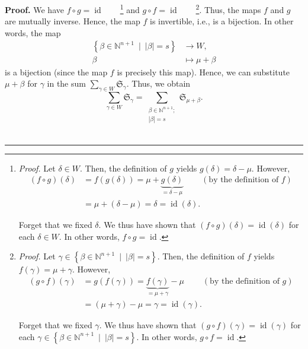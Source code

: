 \documentclass[numbers=enddot,12pt,final,onecolumn,notitlepage,english]{scrartcl}%
\theoremstyle{definition}
\newenvironment{proof}[1][Proof]{\noindent\textbf{#1.} }{\ \rule{0.5em}{0.5em}}
\let\sumnonlimits\sum
\renewcommand{\sum}{\sumnonlimits\limits}
\newenvironment{verlong}{}{}
\begin{document}
\begin{proof}
\begin{verlong}
We have $f\circ g=\operatorname*{id}$\ \ \ \ \footnote{\textit{Proof.} Let
$\delta\in W$. Then, the definition of $g$ yields $g\left(  \delta\right)
=\delta-\mu$. However,%
\begin{align*}
\left(  f\circ g\right)  \left(  \delta\right)   &  =f\left(  g\left(
\delta\right)  \right)  =\mu+\underbrace{g\left(  \delta\right)  }%
_{=\delta-\mu}\ \ \ \ \ \ \ \ \ \ \left(  \text{by the definition of }f\right)
\\
&  =\mu+\left(  \delta-\mu\right)  =\delta=\operatorname*{id}\left(
\delta\right)  .
\end{align*}
\par
Forget that we fixed $\delta$. We thus have shown that $\left(  f\circ
g\right)  \left(  \delta\right)  =\operatorname*{id}\left(  \delta\right)  $
for each $\delta\in W$. In other words, $f\circ g=\operatorname*{id}$.} and
$g\circ f=\operatorname*{id}$\ \ \ \ \footnote{\textit{Proof.} Let $\gamma
\in\left\{  \beta\in\mathbb{N}^{n+1}\ \mid\ \left\vert \beta\right\vert
=s\right\}  $. Then, the definition of $f$ yields $f\left(  \gamma\right)
=\mu+\gamma$. However,%
\begin{align*}
\left(  g\circ f\right)  \left(  \gamma\right)   &  =g\left(  f\left(
\gamma\right)  \right)  =\underbrace{f\left(  \gamma\right)  }_{=\mu+\gamma
}-\mu\ \ \ \ \ \ \ \ \ \ \left(  \text{by the definition of }g\right) \\
&  =\left(  \mu+\gamma\right)  -\mu=\gamma=\operatorname*{id}\left(
\gamma\right)  .
\end{align*}
\par
Forget that we fixed $\gamma$. We thus have shown that $\left(  g\circ
f\right)  \left(  \gamma\right)  =\operatorname*{id}\left(  \gamma\right)  $
for each $\gamma\in\left\{  \beta\in\mathbb{N}^{n+1}\ \mid\ \left\vert
\beta\right\vert =s\right\}  $. In other words, $g\circ f=\operatorname*{id}%
$.}. Thus, the maps $f$ and $g$ are mutually inverse. Hence, the map $f$ is
invertible, i.e., is a bijection. In other words, the map%
\begin{align*}
\left\{  \beta\in\mathbb{N}^{n+1}\ \mid\ \left\vert \beta\right\vert
=s\right\}   &  \rightarrow W,\\
\beta &  \mapsto\mu+\beta
\end{align*}
is a bijection (since the map $f$ is precisely this map). Hence, we can
substitute $\mu+\beta$ for $\gamma$ in the sum $\sum_{\gamma\in W}%
\mathfrak{S}_{\gamma}$. Thus, we obtain%
\[
\sum_{\gamma\in W}\mathfrak{S}_{\gamma}=\sum_{\substack{\beta\in
\mathbb{N}^{n+1};\\\left\vert \beta\right\vert =s}}\mathfrak{S}_{\mu+\beta}.
\]
\end{verlong}
\end{proof}
\end{document}
